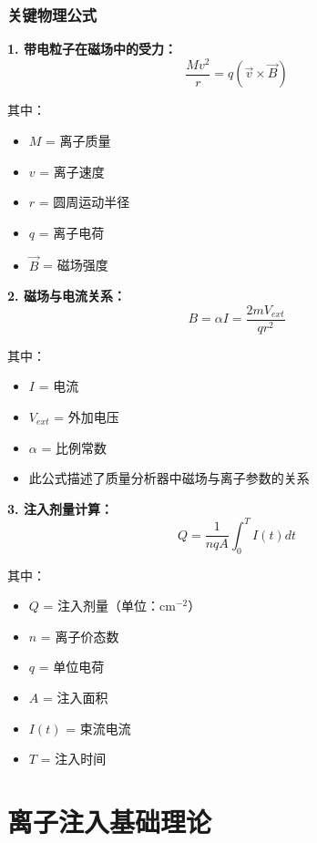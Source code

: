 \documentclass[UTF8,12pt,a4paper]{ctexart}
\begin{document}
\subsubsection{关键物理公式}

\textbf{1. 带电粒子在磁场中的受力：}
\begin{equation}
\frac{M v^2}{r} = q(\vec{v} \times \vec{B})
\end{equation}

其中：
\begin{itemize}
    \item $M$ = 离子质量
    \item $v$ = 离子速度
    \item $r$ = 圆周运动半径
    \item $q$ = 离子电荷
    \item $\vec{B}$ = 磁场强度
\end{itemize}

\textbf{2. 磁场与电流关系：}
\begin{equation}
B = \alpha I = \frac{2m V_{ext}}{q r^2}
\end{equation}

其中：
\begin{itemize}
    \item $I$ = 电流
    \item $V_{ext}$ = 外加电压
    \item $\alpha$ = 比例常数
    \item 此公式描述了质量分析器中磁场与离子参数的关系
\end{itemize}

\textbf{3. 注入剂量计算：}
\begin{equation}
Q = \frac{1}{nqA} \int_0^T I(t) dt
\end{equation}

其中：
\begin{itemize}
    \item $Q$ = 注入剂量（单位：cm$^{-2}$）
    \item $n$ = 离子价态数
    \item $q$ = 单位电荷
    \item $A$ = 注入面积
    \item $I(t)$ = 束流电流
    \item $T$ = 注入时间
\end{itemize}

\newpage

\section{离子注入基础理论}
\end{document}
